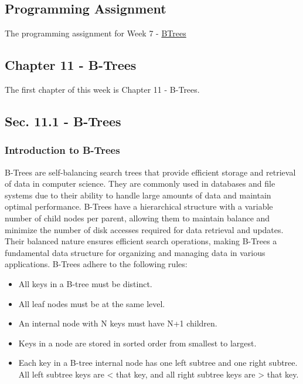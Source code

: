 \subsection{Programming Assignment}

The programming assignment for Week 7 - \href{https://github.com/cu-cspb-2270-Summer-2023/pa5-RelativiBit}{BTrees}

\subsection{Chapter 11 - B-Trees}

The first chapter of this week is Chapter 11 - B-Trees.

\subsection*{Sec. 11.1 - B-Trees}

\subsubsection{Introduction to B-Trees}

B-Trees are self-balancing search trees that provide efficient storage and retrieval of data in computer science. They are commonly used in databases and file systems due to their ability to handle large amounts of data and maintain optimal performance. B-Trees have a hierarchical structure with a variable number of child nodes per parent, 
allowing them to maintain balance and minimize the number of disk accesses required for data retrieval and updates. Their balanced nature ensures efficient search operations, making B-Trees a fundamental data structure for organizing and managing data in various applications. B-Trees adhere to the following rules:

\begin{itemize}
    \item All keys in a B-tree must be distinct.
    \item All leaf nodes must be at the same level.
    \item An internal node with N keys must have N+1 children.
    \item Keys in a node are stored in sorted order from smallest to largest.
    \item Each key in a B-tree internal node has one left subtree and one right subtree. All left subtree keys are < that key, and all right subtree keys are > that key.
\end{itemize}

